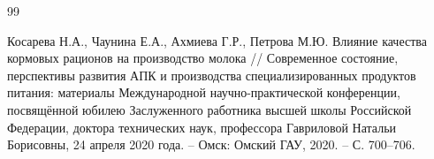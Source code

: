 


\begin{thebibliography}{99}

Косарева Н.А., Чаунина Е.А., Ахмиева Г.Р., Петрова М.Ю. 
Влияние качества кормовых рационов на производство молока // 
Современное состояние, перспективы развития АПК и производства специализированных продуктов питания: 
материалы Международной научно-практической конференции, посвящённой юбилею Заслуженного работника 
высшей школы Российской Федерации, доктора технических наук, профессора Гавриловой Натальи Борисовны, 
24 апреля 2020 года. – Омск: Омский ГАУ, 2020. – С. 700–706.

\end{thebibliography}


